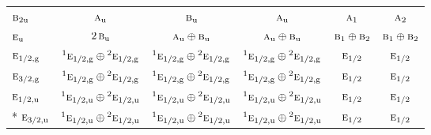 \documentclass[10pt,a4paper]{article}
\numberwithin{equation}{section}
\newcommand{\irr}[1]{\text{\normalfont\scshape #1}}
\newcommand{\conjpair}[1]{{}^{#1}}
\newcommand{\ptag}[1]{\mathrm{#1}}
\begin{document}
{\begin{longtable}{@{}lccccc@{}}
$\irr{b}_{2\ptag{u}}$ & $\irr{a}_{\ptag{u}}$ & $\irr{b}_{\ptag{u}}$ & $\irr{a}_{\ptag{u}}$ & $\irr{a}_{1}$ & $\irr{a}_{2}$\\
$\irr{e}_{\ptag{u}}$ & $2\,\irr{b}_{\ptag{u}}$ & $\irr{a}_{\ptag{u}}\oplus \irr{b}_{\ptag{u}}$ & $\irr{a}_{\ptag{u}}\oplus \irr{b}_{\ptag{u}}$ & $\irr{b}_{1}\oplus \irr{b}_{2}$ & $\irr{b}_{1}\oplus \irr{b}_{2}$\\
$\irr{e}_{1/2,\ptag{g}}$ & $\conjpair{1}\irr{e}_{1/2,\ptag{g}}\oplus \conjpair{2}\irr{e}_{1/2,\ptag{g}}$ & $\conjpair{1}\irr{e}_{1/2,\ptag{g}}\oplus \conjpair{2}\irr{e}_{1/2,\ptag{g}}$ & $\conjpair{1}\irr{e}_{1/2,\ptag{g}}\oplus \conjpair{2}\irr{e}_{1/2,\ptag{g}}$ & $\irr{e}_{1/2}$ & $\irr{e}_{1/2}$\\
$\irr{e}_{3/2,\ptag{g}}$ & $\conjpair{1}\irr{e}_{1/2,\ptag{g}}\oplus \conjpair{2}\irr{e}_{1/2,\ptag{g}}$ & $\conjpair{1}\irr{e}_{1/2,\ptag{g}}\oplus \conjpair{2}\irr{e}_{1/2,\ptag{g}}$ & $\conjpair{1}\irr{e}_{1/2,\ptag{g}}\oplus \conjpair{2}\irr{e}_{1/2,\ptag{g}}$ & $\irr{e}_{1/2}$ & $\irr{e}_{1/2}$\\
$\irr{e}_{1/2,\ptag{u}}$ & $\conjpair{1}\irr{e}_{1/2,\ptag{u}}\oplus \conjpair{2}\irr{e}_{1/2,\ptag{u}}$ & $\conjpair{1}\irr{e}_{1/2,\ptag{u}}\oplus \conjpair{2}\irr{e}_{1/2,\ptag{u}}$ & $\conjpair{1}\irr{e}_{1/2,\ptag{u}}\oplus \conjpair{2}\irr{e}_{1/2,\ptag{u}}$ & $\irr{e}_{1/2}$ & $\irr{e}_{1/2}$\\*
$\irr{e}_{3/2,\ptag{u}}$ & $\conjpair{1}\irr{e}_{1/2,\ptag{u}}\oplus \conjpair{2}\irr{e}_{1/2,\ptag{u}}$ & $\conjpair{1}\irr{e}_{1/2,\ptag{u}}\oplus \conjpair{2}\irr{e}_{1/2,\ptag{u}}$ & $\conjpair{1}\irr{e}_{1/2,\ptag{u}}\oplus \conjpair{2}\irr{e}_{1/2,\ptag{u}}$ & $\irr{e}_{1/2}$ & $\irr{e}_{1/2}$\\
\bottomrule\end{longtable}}
\end{document}
